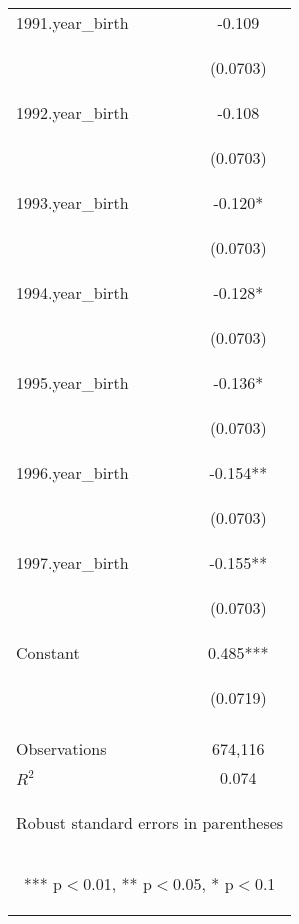\documentclass[]{article}
\begin{document}
\begin{center}
\begin{tabular}{lc}
1991.year\_birth & -0.109 \\
\vspace{4pt} & \begin{footnotesize}(0.0703)\end{footnotesize} \\
1992.year\_birth & -0.108 \\
\vspace{4pt} & \begin{footnotesize}(0.0703)\end{footnotesize} \\
1993.year\_birth & -0.120* \\
\vspace{4pt} & \begin{footnotesize}(0.0703)\end{footnotesize} \\
1994.year\_birth & -0.128* \\
\vspace{4pt} & \begin{footnotesize}(0.0703)\end{footnotesize} \\
1995.year\_birth & -0.136* \\
\vspace{4pt} & \begin{footnotesize}(0.0703)\end{footnotesize} \\
1996.year\_birth & -0.154** \\
\vspace{4pt} & \begin{footnotesize}(0.0703)\end{footnotesize} \\
1997.year\_birth & -0.155** \\
\vspace{4pt} & \begin{footnotesize}(0.0703)\end{footnotesize} \\
Constant & 0.485*** \\
 & \begin{footnotesize}(0.0719)\end{footnotesize} \\
\vspace{4pt} & \begin{footnotesize}\end{footnotesize} \\
Observations & 674,116 \\
 $R^2$ & 0.074 \\ \hline
\multicolumn{2}{c}{\begin{footnotesize} Robust standard errors in parentheses\end{footnotesize}} \\
\multicolumn{2}{c}{\begin{footnotesize} *** p$<$0.01, ** p$<$0.05, * p$<$0.1\end{footnotesize}} \\
\end{tabular}
\end{center}
\end{document}
